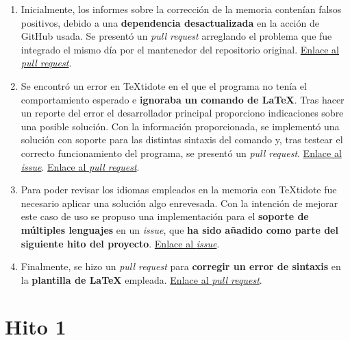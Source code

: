 \begin{enumerate}
	\item{Inicialmente, los informes sobre la corrección de la memoria contenían falsos positivos, debido a una \textbf{dependencia desactualizada} en la acción de GitHub usada. Se presentó un \textit{pull request} arreglando el problema que fue integrado el mismo día por el mantenedor del repositorio original. \href{https://github.com/ChiefGokhlayeh/textidote-action/pull/33}{Enlace al \textit{pull request}}.}
	
	\item{Se encontró un error en TeXtidote en el que el programa no tenía el comportamiento esperado e \textbf{ignoraba un comando de LaTeX}. Tras hacer un reporte del error el desarrollador principal proporciono indicaciones sobre una posible solución. Con la información proporcionada, se implementó una solución con soporte para las distintas sintaxis del comando y, tras testear el correcto funcionamiento del programa, se presentó un \textit{pull request}. \href{https://github.com/sylvainhalle/textidote/issues/208}{Enlace al \textit{issue}}. \href{https://github.com/sylvainhalle/textidote/pull/209}{Enlace al \textit{pull request}}.}
	
	\item{Para poder revisar los idiomas empleados en la memoria con TeXtidote fue necesario aplicar una solución algo enrevesada. Con la intención de mejorar este caso de uso se propuso una implementación para el \textbf{soporte de múltiples lenguajes} en un \textit{issue}, que \textbf{ha sido añadido como parte del siguiente hito del proyecto}. \href{https://github.com/sylvainhalle/textidote/issues/203}{Enlace al \textit{issue}}.}
	
	\item{Finalmente, se hizo un \textit{pull request} para \textbf{corregir un error de sintaxis} en la \textbf{plantilla de LaTeX} empleada. \href{https://github.com/JJ/plantilla-TFG-ETSIIT/pull/7}{Enlace al \textit{pull request}}.}
\end{enumerate}

\section{Hito 1}